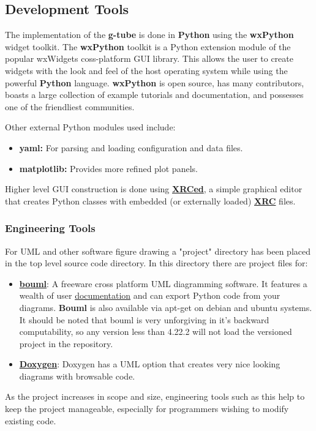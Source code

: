 \documentclass[12pt]{article}
\begin{document}
\subsection*{Development Tools}

	The implementation of the {\bf g-tube} is done in {\bf Python} using the {\bf wxPython} widget toolkit. The {\bf wxPython} toolkit is a Python extension module of the popular {wxWidgets} coss-platform GUI library. This allows the user to create widgets with the look and feel of the host operating system while using the powerful {\bf Python} language. {\bf wxPython} is open source, has many contributors, boasts a large collection of example tutorials and documentation, and possesses one of the friendliest communities.
	
Other external Python modules used include:

\begin{itemize}	
\item[] {\bf yaml:} For parsing and loading configuration and data files.
\item[] {\bf matplotlib:} Provides more refined plot panels.
\end{itemize}

Higher level GUI construction is done using \href{http://xrced.sourceforge.net/}{\bf XRCed}, a simple graphical editor that creates Python classes with embedded (or externally loaded) \href{http://wiki.wxpython.org/XRCTutorial}{\bf XRC} files. 

\subsubsection*{Engineering Tools}

For UML and other software figure drawing a "project" directory has been placed in the top level source code directory. In this directory there are project files for:

\begin{itemize}
\item[] \href{http://bouml.free.fr}{\bf bouml}: A freeware cross platform UML diagramming software. It features a wealth of user \href{http://bouml.free.fr/doc/index.html}{documentation} and can export Python code from your diagrams. {\bf Bouml} is also available via apt-get on debian and ubuntu systems. It should be noted that bouml is very unforgiving in it's backward computability, so any version less than 4.22.2 will not load the versioned project in the repository.
\item[] \href{http://www.stack.nl/~dimitri/doxygen/}{\bf Doxygen}: Doxygen has a UML option that creates very nice looking diagrams with browsable code.
\end{itemize}

As the project increases in scope and size, engineering tools such as this help to keep the project manageable, especially for programmers wishing to modify existing code.
\end{document}
